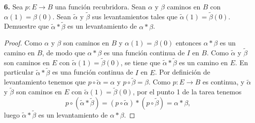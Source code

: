 \textbf{6.} Sea $p : E \to B$ una función recubridora. Sean $\alpha$ y $\beta$ caminos en $B$ con $\alpha(1) = \beta(0)$. Sean $\widetilde{\alpha}$ y $\widetilde{\beta}$ sus levantamientos tales que $\widetilde{\alpha}(1) = \widetilde{\beta}(0)$. Demuestre que $\widetilde{\alpha} * \widetilde{\beta}$ es un levantamiento de $\alpha * \beta$.
\begin{proof}
   Como $\alpha$ y $\beta$ son caminos en $B$ y $\alpha (1)=\beta (0)$ entonces $\alpha * \beta$ es un camino en $B$, de modo que $\alpha*\beta$ es una función continua de $I$ en $B$. Como $\widetilde{\alpha}$ y $\widetilde{\beta}$ son caminos en $E$ con $\widetilde{\alpha}(1)=\widetilde{\beta}(0)$, se tiene que $\widetilde{\alpha}*\widetilde{\beta}$ es un camino en $E$. En particular $\widetilde{\alpha}*\widetilde{\beta}$ es una función continua de $I$ en $E$. Por definición de levantamiento tenemos que $p \circ \widetilde{\alpha} = \alpha$ y $p \circ \widetilde{\beta} = \beta$.
   Como $p: E \to B$ es continua, y $\widetilde{\alpha}$ y $\widetilde{\beta}$ son caminos en $E$ con $\widetilde{\alpha}(1) = \widetilde{\beta}(0)$, por el punto 1 de la tarea tenemos
   $$
      p \circ (\widetilde{\alpha} * \widetilde{\beta}) = (p \circ \widetilde{\alpha}) * (p \circ \widetilde{\beta}) = \alpha * \beta,
   $$
   luego $\widetilde{\alpha} * \widetilde{\beta}$ es un levantamiento de $\alpha * \beta$.
\end{proof}\clearpage
